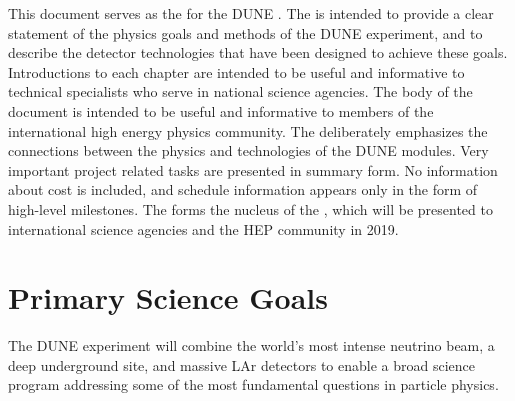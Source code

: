 This document serves as the  for the DUNE .  The   is intended to provide a clear statement of the physics goals and methods of the DUNE experiment, and to describe the detector technologies that have been designed to achieve these goals. Introductions to each chapter are intended to be useful and informative to technical specialists who serve in national science agencies. The body of the document is intended to be useful and informative to members of the international high energy physics community.  The  deliberately emphasizes the connections between the physics and technologies of the DUNE  modules. Very important project related tasks are presented in summary form. No information about cost is included, and schedule information appears only in the form of high-level milestones. The  forms the nucleus of the , which will be presented to international science  agencies and the HEP community in 2019.


%

\section{Primary Science Goals} %


The DUNE experiment will combine the world's most intense neutrino beam, a deep underground site, and massive LAr detectors to enable a broad science program addressing some of the most fundamental questions in particle physics. 


